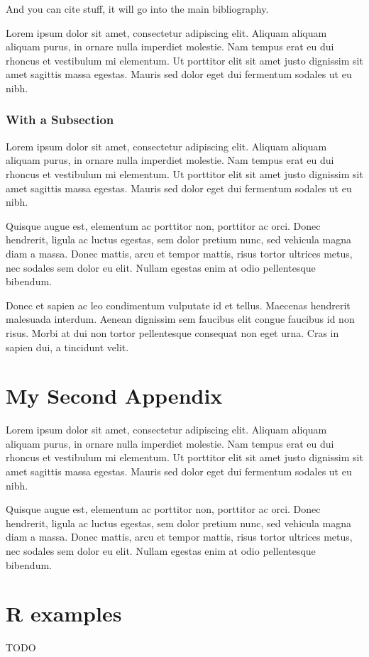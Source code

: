 \documentclass[11pt,a4paper,oneside,article]{memoir}
\begin{document}
And you can cite \cite{tobias:book} stuff, it will go into the main bibliography.

Lorem ipsum dolor sit amet, consectetur adipiscing elit. Aliquam aliquam aliquam purus, in ornare nulla imperdiet molestie. Nam tempus erat eu dui rhoncus et vestibulum mi elementum. Ut porttitor elit sit amet justo dignissim sit amet sagittis massa egestas. Mauris sed dolor eget dui fermentum sodales ut eu nibh.

\subsection{With a Subsection}

Lorem ipsum dolor sit amet, consectetur adipiscing elit. Aliquam aliquam aliquam purus, in ornare nulla imperdiet molestie. Nam tempus erat eu dui rhoncus et vestibulum mi elementum. Ut porttitor elit sit amet justo dignissim sit amet sagittis massa egestas. Mauris sed dolor eget dui fermentum sodales ut eu nibh.

Quisque augue est, elementum ac porttitor non, porttitor ac orci. Donec hendrerit, ligula ac luctus egestas, sem dolor pretium nunc, sed vehicula magna diam a massa. Donec mattis, arcu et tempor mattis, risus tortor ultrices metus, nec sodales sem dolor eu elit. Nullam egestas enim at odio pellentesque bibendum. 

Donec et sapien ac leo condimentum vulputate id et tellus. Maecenas hendrerit malesuada interdum. Aenean dignissim sem faucibus elit congue faucibus id non risus. Morbi at dui non tortor pellentesque consequat non eget urna. Cras in sapien dui, a tincidunt velit.

\clearpage %
\chapter{My Second Appendix}\label{appx:second}

Lorem ipsum dolor sit amet, consectetur adipiscing elit. Aliquam aliquam aliquam purus, in ornare nulla imperdiet molestie. Nam tempus erat eu dui rhoncus et vestibulum mi elementum. Ut porttitor elit sit amet justo dignissim sit amet sagittis massa egestas. Mauris sed dolor eget dui fermentum sodales ut eu nibh.

Quisque augue est, elementum ac porttitor non, porttitor ac orci. Donec hendrerit, ligula ac luctus egestas, sem dolor pretium nunc, sed vehicula magna diam a massa. Donec mattis, arcu et tempor mattis, risus tortor ultrices metus, nec sodales sem dolor eu elit. Nullam egestas enim at odio pellentesque bibendum. 

\clearpage
{}
\chapter{R examples}
TODO
\end{document}
